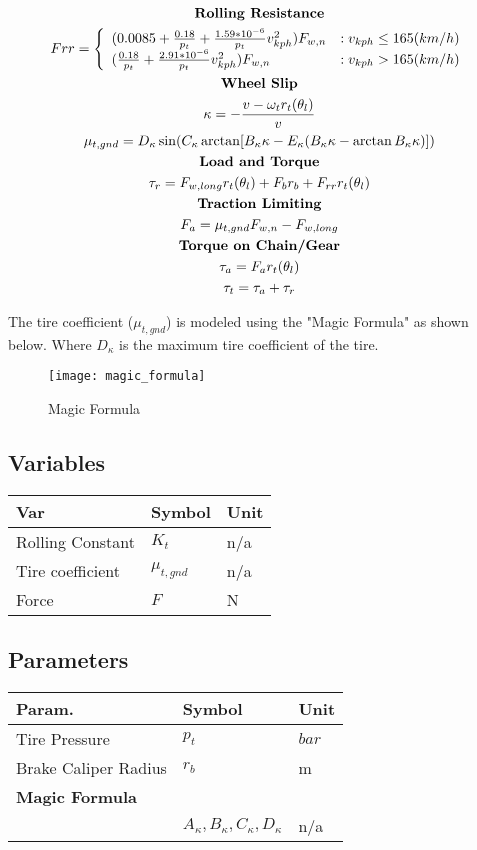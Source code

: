 \documentclass[../SimBALink.tex]{subfiles}
\begin{document}
\begin{gather}
\notag \textbf{Rolling Resistance} \\
Frr = 
\left\{
  \begin{array}{lr}
    (0.0085 + \frac{0.18}{p_t} + \frac{1.59*10^{-6}}{p_t}v_{kph}^2)F_{w,n} & : v_{kph} \le 165 (km/h)\\
    (\frac{0.18}{p_t} + \frac{2.91*10^{-6}}{p_t}v_{kph}^2)F_{w,n} & : v_{kph} > 165 (km/h)
  \end{array}
\right. \\
\notag \textbf{Wheel Slip} \\
\kappa = -\frac{v - \omega_t r_t(\theta_l)}{v} \\
\mu_{t,gnd} =  D_{\kappa}\sin(C_{\kappa} \arctan[B_{\kappa}\kappa - E_{\kappa}(B_{\kappa}\kappa - \arctan B_{\kappa}\kappa)])  \\
\notag \textbf{Load and Torque} \\
\tau_r = F_{w,long}r_t(\theta_l) + F_br_b + F_{rr}r_t(\theta_l) \\
\notag \textbf{Traction Limiting} \\
F_a = \mu_{t,gnd} F_{w,n} - F_{w,long} \\
\notag \textbf{Torque on Chain/Gear} \\
\tau_a = F_ar_t(\theta_l) \\
\tau_t = \tau_a + \tau_r
\end{gather}

The tire coefficient ($\mu_{t,gnd}$) is modeled using the "Magic Formula" as shown below. Where $D_{\kappa}$ is the maximum tire coefficient of the tire. 

 \begin{figure}[H]
  \centering
  \texttt{[image: magic\_formula]}
  \caption{Magic Formula }
\end{figure}

\subsection{Variables}
	\begin{tabular}{ l | l | l  }
		Var					&	Symbol		&	Unit		\\	\hline
		Rolling Constant	&	$K_t$		& 	n/a \\
		Tire coefficient 	& $\mu_{t,gnd}$ &	n/a \\
		Force 				&	$F$	&	N \\
	\end{tabular}
\subsection{Parameters}
	\begin{tabular}{ l | l | l  }
		Param.					&	Symbol		&	Unit		\\	\hline
		Tire Pressure		&	$p_t$		&	 $bar$ \\
		Brake Caliper Radius &	$r_b$		&	m \\		
		\textbf{Magic Formula}\\		&	$A_{\kappa},B_{\kappa},C_{\kappa},D_{\kappa}$		&	 n/a \\
	\end{tabular}
	
\end{document}
